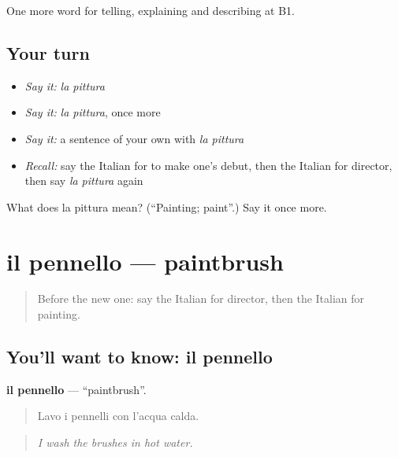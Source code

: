 \begin{grammarlens}[title={What you've built}]
One more word for telling, explaining and describing at B1.
\end{grammarlens}

\subsection*{Your turn}
\begin{itemize}
\raggedright
  \item \emph{Say it:} \emph{la pittura}
  \item \emph{Say it:} \emph{la pittura}, once more
  \item \emph{Say it:} a sentence of your own with \emph{la pittura}
  \item \emph{Recall:} say the Italian for to make one's debut, then the Italian for director, then say \emph{la pittura} again
\end{itemize}

\begin{tcolorbox}[breakable,colback=teal!4,colframe=teal!35!black,title={Before you move on}]
What does la pittura mean? (\textquotedblleft{}Painting; paint\textquotedblright{}.) Say it once more.
\end{tcolorbox}
\section[il pennello]{il pennello — paintbrush}

\label{lesson:IT-C521-pennello}



\begin{quote}
Before the new one: say the Italian for director, then the Italian for painting.
\end{quote}

\subsection*{You'll want to know: il pennello}
\textbf{il pennello} — \textquotedblleft{}paintbrush\textquotedblright{}.

\begin{quote}
Lavo i pennelli con l'acqua calda.
\end{quote}

\begin{quote}
\emph{I wash the brushes in hot water.}
\end{quote}

